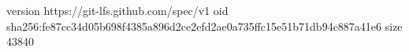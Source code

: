 version https://git-lfs.github.com/spec/v1
oid sha256:fe87cc34d05b698f4385a896d2ce2efd2ae0a735ffc15e51b71db94c887a41e6
size 43840
